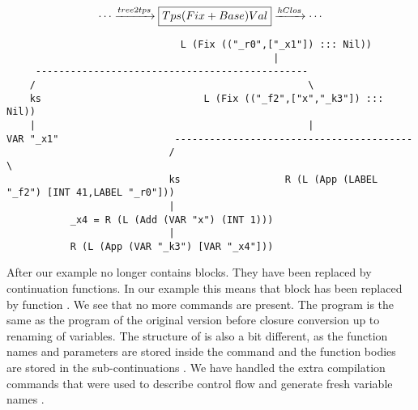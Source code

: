 \begin{landscape}
\begin{gather*}
  \cdots \xrightarrow{tree2tps} \boxed{Tps (Fix + Base) Val} \xrightarrow{hClos} \cdots
\end{gather*}
\begin{lstlisting}
                              L (Fix (("_r0",["_x1"]) ::: Nil))
                                              |
     -----------------------------------------------
    /                                               \
    ks                            L (Fix (("_f2",["x","_k3"]) ::: Nil))
    |                                               |
VAR "_x1"                    -----------------------------------------
                            /                                         \
                            ks                  R (L (App (LABEL "_f2") [INT 41,LABEL "_r0"]))
                            |
           _x4 = R (L (Add (VAR "x") (INT 1)))
                            |
           R (L (App (VAR "_k3") [VAR "_x4"]))

\end{lstlisting}
After  our example no longer contains blocks. They have been replaced by continuation functions. In our example this means that block  has been replaced by function . We see that no more  commands are present. The program is the same as the program of the original version before closure conversion up to renaming of variables. The structure of  is also a bit different, as the function names and parameters are stored inside the  command and the function bodies are stored in the sub-continuations . We have handled the extra compilation commands that were used to describe control flow  and generate fresh variable names .
\end{landscape}
\clearpage

